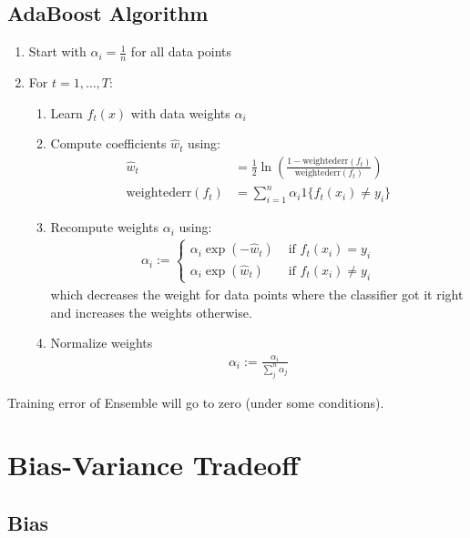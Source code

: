 \documentclass[8pt, a4paper, landscape, includeheadfoot]{extarticle}
\begin{document}
\begin{multicols*}{4}
	\subsection{AdaBoost Algorithm}
	\begin{enumerate}[itemsep=0pt]
		\item Start with $\alpha_i = \frac{1}{n}$ for all data points
		\item For $t = 1,\dots, T$:
		      \begin{enumerate}[itemsep=0pt, leftmargin=10pt]
			      \item Learn $f_t(x)$ with data weights $\alpha_i$
			      \item Compute coefficients $\hat{w}_t$ using:
			            \begin{align*}
				            \hat{w}_t               & = \frac{1}{2}\ln\left(\frac{1 - \text{weightederr}(f_t)}{\text{weightederr}(f_t)}\right) \\
				            \text{weightederr}(f_t) & = \sum_{i = 1}^{n}\alpha_i 1\{f_t(x_i) \neq y_i\}
			            \end{align*}
			      \item Recompute weights $\alpha_i$ using:
			            \begin{align*}
				            \alpha_i := \begin{cases}
					            \alpha_i\exp(-\hat{w}_t) & \text{ if } f_t(x_i) = y_i    \\
					            \alpha_i\exp(\hat{w}_t)  & \text{ if } f_t(x_i) \neq y_i
				            \end{cases}
			            \end{align*}
			            which decreases the weight for data points where the classifier got it right and increases the weights otherwise.
			      \item Normalize weights
			            \begin{align*}
				            \alpha_i := \frac{\alpha_i}{\sum_{j}^{n}\alpha_j}
			            \end{align*}
		      \end{enumerate}
	\end{enumerate}
	Training error of Ensemble will go to zero (under some conditions).

	\section{Bias-Variance Tradeoff}
	\subsection{Bias}


\end{multicols*}
\end{document}
